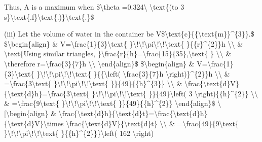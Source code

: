 Thus, A is a maximum when \$\textbackslash theta =0.324\textbackslash{}
\textbackslash text\{(to 3 s\}\textbackslash text\{.f\}\textbackslash text\{.)\}\textbackslash text\{.\}\$ 

\quad{} (iii) Let the volume of water in the container be V\$\textbackslash text\{c\}\{\{\textbackslash text\{m\}\}\textasciicircum\{3\}\}.\$
\$\textbackslash begin\{align\} \& V=\textbackslash frac\{1\}\{3\}\textbackslash text\{
\}\textbackslash !\textbackslash !\textbackslash pi\textbackslash !\textbackslash !\textbackslash text\{
\}\{\{r\}\textasciicircum\{2\}\}h \textbackslash\textbackslash{}
\& \textbackslash text\{Using similar triangles, \}\textbackslash frac\{r\}\{h\}=\textbackslash frac\{15\}\{35\},\textbackslash text\{
\} \textbackslash\textbackslash{} \& \textbackslash therefore r=\textbackslash frac\{3\}\{7\}h
\textbackslash\textbackslash{} \textbackslash end\{align\}\$ \$\textbackslash begin\{align\}
\& V=\textbackslash frac\{1\}\{3\}\textbackslash text\{ \}\textbackslash !\textbackslash !\textbackslash pi\textbackslash !\textbackslash !\textbackslash text\{
\}\{\{\textbackslash left( \textbackslash frac\{3\}\{7\}h \textbackslash right)\}\textasciicircum\{2\}\}h
\textbackslash\textbackslash{} \& =\textbackslash frac\{3\textbackslash text\{
\}\textbackslash !\textbackslash !\textbackslash pi\textbackslash !\textbackslash !\textbackslash text\{
\}\}\{49\}\{\{h\}\textasciicircum\{3\}\} \textbackslash\textbackslash{}
\& \textbackslash frac\{\textbackslash text\{d\}V\}\{\textbackslash text\{d\}h\}=\textbackslash frac\{3\textbackslash text\{
\}\textbackslash !\textbackslash !\textbackslash pi\textbackslash !\textbackslash !\textbackslash text\{
\}\}\{49\}\textbackslash left( 3 \textbackslash right)\{\{h\}\textasciicircum\{2\}\}
\textbackslash\textbackslash{} \& =\textbackslash frac\{9\textbackslash text\{
\}\textbackslash !\textbackslash !\textbackslash pi\textbackslash !\textbackslash !\textbackslash text\{
\}\}\{49\}\{\{h\}\textasciicircum\{2\}\} \textbackslash end\{align\}\$
\textbackslash{[}\textbackslash begin\{align\} \& \textbackslash frac\{\textbackslash text\{d\}h\}\{\textbackslash text\{d\}t\}=\textbackslash frac\{\textbackslash text\{d\}h\}\{\textbackslash text\{d\}V\}\textbackslash times
\textbackslash frac\{\textbackslash text\{d\}V\}\{\textbackslash text\{d\}t\}
\textbackslash\textbackslash{} \& =\textbackslash frac\{49\}\{9\textbackslash text\{
\}\textbackslash !\textbackslash !\textbackslash pi\textbackslash !\textbackslash !\textbackslash text\{
\}\{\{h\}\textasciicircum\{2\}\}\}\textbackslash left( 162 \textbackslash right)
